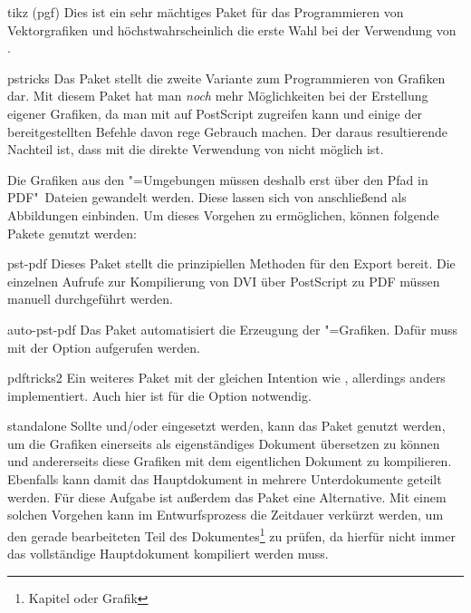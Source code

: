 \begin{packages}
\item[tikz](pgf)
  Dies ist ein sehr mächtiges Paket für das Programmieren von Vektorgrafiken 
  und höchstwahrscheinlich die erste Wahl bei der Verwendung von 
  .
\item[pstricks]
  Das Paket  stellt die zweite Variante zum Programmieren 
  von Grafiken dar. Mit diesem Paket hat man \emph{noch} mehr Möglichkeiten bei 
  der Erstellung eigener Grafiken, da man mit  auf 
  PostScript zugreifen kann und einige der bereitgestellten Befehle davon rege 
  Gebrauch machen. Der daraus resultierende Nachteil ist, dass mit 
   die direkte Verwendung von  nicht 
  möglich ist.
  
  Die Grafiken aus den "=Umgebungen müssen deshalb erst 
  über den Pfad 
  in PDF"~Dateien gewandelt werden. Diese lassen sich von  
  anschließend als Abbildungen einbinden. Um dieses Vorgehen zu ermöglichen, 
  können folgende Pakete genutzt werden:
  \begin{packages}
  \item[pst-pdf]
    Dieses Paket stellt die prinzipiellen Methoden für den Export bereit. Die 
    einzelnen Aufrufe zur Kompilierung von DVI über PostScript zu PDF müssen 
    manuell durchgeführt werden.
  \item[auto-pst-pdf]
    Das Paket automatisiert die Erzeugung der "=Grafiken. 
    Dafür muss  mit der Option  
    aufgerufen werden.
  \item[pdftricks2]
    Ein weiteres Paket mit der gleichen Intention wie , 
    allerdings anders implementiert. Auch hier ist für  die 
    Option  notwendig.
  \end{packages}
\item[standalone]
  Sollte  und/oder  eingesetzt werden, kann 
  das Paket  genutzt werden, um die Grafiken einerseits 
  als eigenständiges Dokument übersetzen zu können und andererseits diese 
  Grafiken mit dem eigentlichen Dokument zu kompilieren. Ebenfalls kann damit 
  das Hauptdokument in mehrere Unterdokumente geteilt werden. Für diese Aufgabe 
  ist außerdem das Paket  eine Alternative. Mit einem solchen 
  Vorgehen kann im Entwurfsprozess die Zeitdauer verkürzt werden, um den gerade 
  bearbeiteten Teil des Dokumentes\footnote{Kapitel oder Grafik} zu prüfen, da 
  hierfür nicht immer das vollständige Hauptdokument kompiliert werden muss. 
\end{packages}

